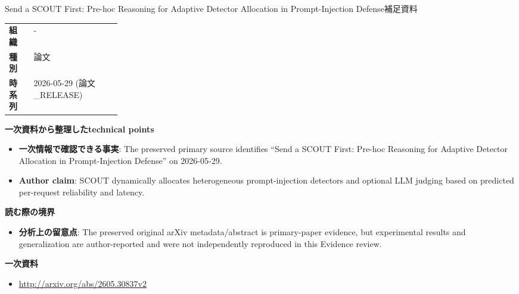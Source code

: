 \begin{technicalnote}{Send a SCOUT First: Pre-hoc Reasoning for Adaptive Detector Allocation in Prompt-Injection Defense}{補足資料}
\begin{tabularx}{\linewidth}{@{}>{\bfseries}p{0.22\linewidth}X@{}}
組織 & - \\
種別 & 論文 \\
時系列 & 2026-05-29 (論文\_RELEASE) \\
\end{tabularx}
\smallskip
{\bfseries 一次資料から整理したtechnical points}
\begin{itemize}[leftmargin=1.5em,itemsep=0.35em]
\item \textbf{一次情報で確認できる事実}: The preserved primary source identifies “Send a SCOUT First: Pre-hoc Reasoning for Adaptive Detector Allocation in Prompt-Injection Defense” on 2026-05-29.
\item \textbf{Author claim}: SCOUT dynamically allocates heterogeneous prompt-injection detectors and optional LLM judging based on predicted per-request reliability and latency.
\end{itemize}
{\bfseries 読む際の境界}
\begin{itemize}[leftmargin=1.5em,itemsep=0.35em]
\item \textbf{分析上の留意点}: The preserved original arXiv metadata/abstract is primary-paper evidence, but experimental results and generalization are author-reported and were not independently reproduced in this Evidence review.
\end{itemize}
{\bfseries 一次資料}
\begingroup\sloppy
\begin{itemize}[leftmargin=1.5em,itemsep=0.25em]
\item {\scriptsize\url{http://arxiv.org/abs/2605.30837v2}}
\end{itemize}
\endgroup
\end{technicalnote}
\medskip

